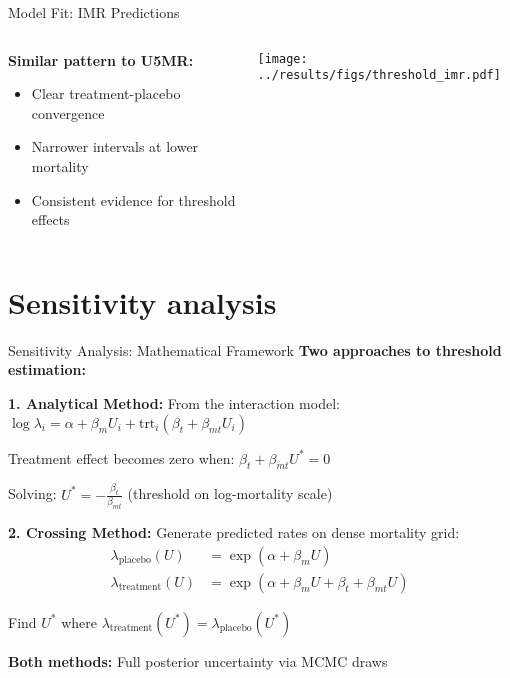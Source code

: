 \documentclass[aspectratio=169]{beamer}\usepackage[]{graphicx}\usepackage[dvipsnames]{xcolor}
\begin{document}
\begin{frame}{Model Fit: IMR Predictions}
\begin{columns}
\begin{column}{0.35\textwidth}
\textbf{Similar pattern to U5MR:}
\begin{itemize}
  \item Clear treatment-placebo convergence
  \item Narrower intervals at lower mortality
  \item Consistent evidence for threshold effects
\end{itemize}
\end{column}
\begin{column}{0.65\textwidth}
\begin{center}
\texttt{[image: ../results/figs/threshold\_imr.pdf]}
\end{center}
\end{column}
\end{columns}
\end{frame}

\section{Sensitivity analysis}

\begin{frame}{Sensitivity Analysis: Mathematical Framework}
\textbf{Two approaches to threshold estimation:}

\vspace{0.3cm}
\textbf{1. Analytical Method:}
From the interaction model: $\log \lambda_i = \alpha + \beta_m U_i + \text{trt}_i(\beta_t + \beta_{mt} U_i)$

Treatment effect becomes zero when: $\beta_t + \beta_{mt} U^* = 0$

Solving: $U^* = -\frac{\beta_t}{\beta_{mt}}$ (threshold on log-mortality scale)

\vspace{0.3cm}
\textbf{2. Crossing Method:}
Generate predicted rates on dense mortality grid:
\begin{align*}
\lambda_{\text{placebo}}(U) &= \exp(\alpha + \beta_m U) \\
\lambda_{\text{treatment}}(U) &= \exp(\alpha + \beta_m U + \beta_t + \beta_{mt} U)
\end{align*}

Find $U^*$ where $\lambda_{\text{treatment}}(U^*) = \lambda_{\text{placebo}}(U^*)$

\vspace{0.3cm}
\textbf{Both methods:} Full posterior uncertainty via MCMC draws
\end{frame}
\end{document}
